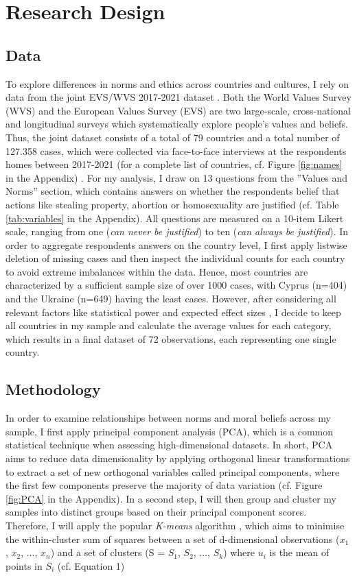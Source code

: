 \documentclass{article}[hidelinks]
\begin{document}
\section{Research Design}
\subsection{Data}
To explore differences in norms and ethics across countries and cultures, I rely on data from the joint EVS/WVS 2017-2021 dataset \citep{Joint}. Both the World Values Survey (WVS) \citep{Haerpfer.2020} and the European Values Survey (EVS) \citep{luijkx2021european} are two large-scale, cross-national and longitudinal surveys which systematically explore people's values and beliefs.
Thus, the joint dataset consists of a total of 79 countries and a total number of 127.358 cases, which were collected via face-to-face interviews at the respondents homes between 2017-2021 (for a complete list of countries, cf. Figure \ref{fig:names} in the Appendix) \citep{Gesis}. 
For my analysis, I draw on 13 questions from the ''Values and Norms'' section, which contains answers on whether the respondents belief that actions like stealing property, abortion or homosexuality are justified (cf. Table \ref{tab:variables} in the Appendix). All questions are measured on a 10-item Likert scale, ranging from one (\emph{can never be justified}) to ten (\emph{can always be justified}).
In order to aggregate respondents answers on the country level, I first apply listwise deletion of missing cases \citep{roth1994missing} and then inspect the individual counts for each country to avoid extreme imbalances within the data. Hence, most countries are characterized by a sufficient sample size of over 1000 cases, with Cyprus (n=404) and the Ukraine (n=649) having the least cases. However, after considering all relevant factors like statistical power and expected effect sizes \citep{kadam2010sample}, I decide to keep all countries in my sample and calculate the average values for each category, which results in a final dataset of 72 observations, each representing one single country.

\subsection{Methodology}
In order to examine relationships between norms and moral beliefs across my sample, I first apply principal component analysis (PCA), which is a common statistical technique when assessing high-dimensional datasets. In short, PCA aims to reduce data dimensionality by applying orthogonal linear transformations to extract a set of new orthogonal variables called principal components, where the first few components preserve the majority of data variation \citep{bro2014principal} (cf. Figure \ref{fig:PCA} in the Appendix).
In a second step, I will then group and cluster my samples into distinct groups based on their principal component scores. Therefore, I will apply the popular \emph{K-means} algorithm \citep{likas2003global}, which aims to minimise the within-cluster sum of squares between a set of d-dimensional observations ($x_1$, $x_2$, ..., $x_n$) and a set of clusters (S = {$S_1$, $S_2$, ..., $S_k$}) where $u_i$ is the mean of points in $S_i$ (cf. Equation 1)
\end{document}
